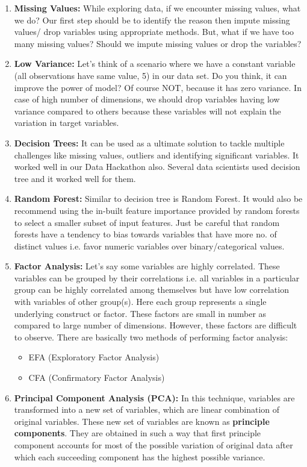\documentclass[12pt]{article}
\theoremstyle{plain}
\begin{document}
\begin{enumerate}
\item  \textbf{Missing Values:} While exploring data, if we encounter missing values, what we do? Our first step should be to identify the reason then impute missing values/ drop variables using appropriate methods. But, what if we have too many missing values? Should we impute missing values or drop the variables?
\item  \textbf{Low Variance:} Let’s think of a scenario where we have a constant variable (all observations have same value, 5) in our data set. Do you think, it can improve the power of model? Of course NOT, because it has zero variance. In case of high number of dimensions, we should drop variables having low variance compared to others because these variables will not explain the variation in target variables.
\item  \textbf{Decision Trees:} It can be used as a ultimate solution to tackle multiple challenges like missing values, outliers and identifying significant variables. It worked well in our Data Hackathon also. Several data scientists used decision tree and it worked well for them.
\item  \textbf{Random Forest:} Similar to decision tree is Random Forest. It would also be recommend using the in-built feature importance provided by random forests to select a smaller subset of input features. Just be careful that random forests have a tendency to bias towards variables that have more no. of distinct values i.e. favor numeric variables over binary/categorical values.
\item  \textbf{Factor Analysis:} Let’s say some variables are highly correlated. These variables can be grouped by their correlations i.e. all variables in a particular group can be highly correlated among themselves but have low correlation with variables of other group(s). Here each group represents a single underlying construct or factor. These factors are small in number as compared to large number of dimensions. However, these factors are difficult to observe. There are basically two methods of performing factor analysis:
	\begin{itemize}
	\item EFA (Exploratory Factor Analysis)
	\item CFA (Confirmatory Factor Analysis)
 	\end{itemize}
\item  \textbf{Principal Component Analysis (PCA):} In this technique, variables are transformed into a new set of variables, which are linear combination of original variables. These new set of variables are known as \textbf{principle components}. They are obtained in such a way that first principle component accounts for most of the possible variation of original data after which each succeeding component has the highest possible variance.


\end{enumerate}
\end{document}

